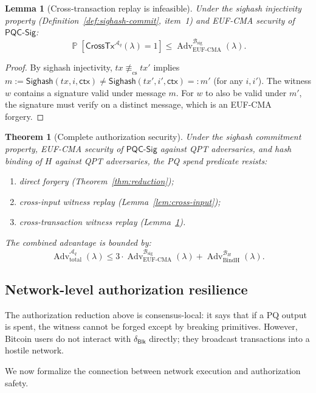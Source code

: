 \documentclass[11pt]{article}
\newtheorem{lemma}{Lemma}
\newtheorem{theorem}{Theorem}
\newcommand{\Prob}{\operatorname{\mathbb{P}}}
\newcommand{\Adv}{\operatorname{Adv}}
\newcommand{\Aq}{\mathcal{A}_q}
\newcommand{\PQC}{\mathsf{PQC}}
\newcommand{\Blk}{\mathsf{Blk}}
\newcommand{\Sighash}{\mathsf{Sighash}}
\newcommand{\DeltaBlk}{\delta_{\Blk}}
\begin{document}
\begin{lemma}[Cross-transaction replay is infeasible]\label{lem:cross-tx}
Under the sighash injectivity property (Definition~\ref{def:sighash-commit}, item~1) and EUF-CMA security of $\PQC\textsf{-Sig}$:
\[
\Prob[\mathsf{CrossTx}^{\Aq}(\lambda)=1] \le \Adv_{\mathrm{EUF\mbox{-}CMA}}^{\mathcal{B}_{\mathrm{sig}}}(\lambda).
\]
\end{lemma}

\begin{proof}
By sighash injectivity, $tx\not\equiv_{\mathrm{cs}} tx'$ implies $m:=\Sighash(tx,i,\textsf{ctx})\neq\Sighash(tx',i',\textsf{ctx})=:m'$ (for any $i,i'$).
The witness $w$ contains a signature valid under message $m$.
For $w$ to also be valid under $m'$, the signature must verify on a distinct message, which is an EUF-CMA forgery.
\end{proof}

\begin{theorem}[Complete authorization security]\label{thm:complete-auth}
Under the sighash commitment property, EUF-CMA security of $\PQC\textsf{-Sig}$ against QPT adversaries, and hash binding of $H$ against QPT adversaries, the PQ spend predicate resists:
\begin{enumerate}[leftmargin=2em]
  \item direct forgery (Theorem~\ref{thm:reduction});
  \item cross-input witness replay (Lemma~\ref{lem:cross-input});
  \item cross-transaction witness replay (Lemma~\ref{lem:cross-tx}).
\end{enumerate}
The combined advantage is bounded by:
\[
\Adv_{\mathrm{total}}^{\Aq}(\lambda) \le 3\cdot\Adv_{\mathrm{EUF\mbox{-}CMA}}^{\mathcal{B}_{\mathrm{sig}}}(\lambda) + \Adv_{\mathrm{BindH}}^{\mathcal{B}_H}(\lambda).
\]
\end{theorem}

\subsection{Network-level authorization resilience}

The authorization reduction above is consensus-local: it says that if a PQ output is spent, the witness cannot be forged except by breaking primitives.
However, Bitcoin users do not interact with $\DeltaBlk$ directly; they broadcast transactions into a hostile network.

We now formalize the connection between network execution and authorization safety.
\end{document}
